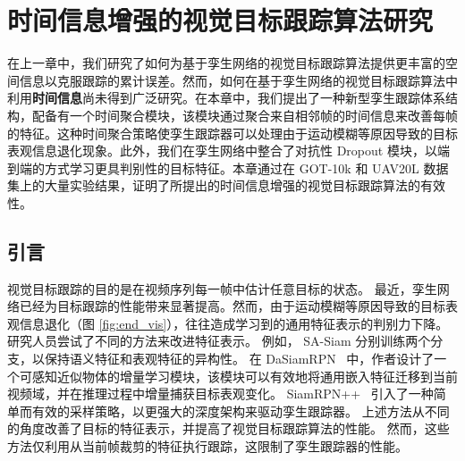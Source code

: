 \chapter{时间信息增强的视觉目标跟踪算法研究}\label{chap:end}
在上一章中，我们研究了如何为基于孪生网络的视觉目标跟踪算法提供更丰富的空间信息以克服跟踪的累计误差。然而，如何在基于孪生网络的视觉目标跟踪算法中利用\textbf{时间信息}尚未得到广泛研究。在本章中，我们提出了一种新型孪生跟踪体系结构，配备有一个时间聚合模块，该模块通过聚合来自相邻帧的时间信息来改善每帧的特征。这种时间聚合策略使孪生跟踪器可以处理由于运动模糊等原因导致的目标表观信息退化现象。此外，我们在孪生网络中整合了对抗性 Dropout 模块，以端到端的方式学习更具判别性的目标特征。本章通过在 GOT-10k \cite{GOT-10k} 和 UAV20L \cite{mueller2016benchmark} 数据集上的大量实验结果，证明了所提出的时间信息增强的视觉目标跟踪算法的有效性。

\section{引言}
视觉目标跟踪的目的是在视频序列每一帧中估计任意目标的状态。 
最近，孪生网络已经为目标跟踪的性能带来显著提高。然而，由于运动模糊等原因导致的目标表观信息退化（图 \ref{fig:end_vis}），往往造成学习到的通用特征表示的判别力下降。
研究人员尝试了不同的方法来改进特征表示。
例如，
SA-Siam \cite{he2018twofold} 分别训练两个分支，以保持语义特征和表观特征的异构性。
在 DaSiamRPN~\cite{zhu2018distractor} 中，作者设计了一个可感知近似物体的增量学习模块，该模块可以有效地将通用嵌入特征迁移到当前视频域，并在推理过程中增量捕获目标表观变化。
SiamRPN++~\cite{SiamRPN++} 引入了一种简单而有效的采样策略，以更强大的深度架构来驱动孪生跟踪器。
上述方法从不同的角度改善了目标的特征表示，并提高了视觉目标跟踪算法的性能。
然而，这些方法仅利用从当前帧裁剪的特征执行跟踪，这限制了孪生跟踪器的性能。

